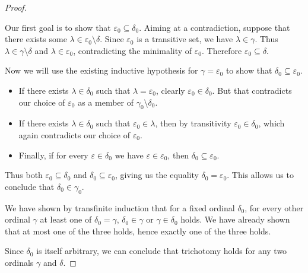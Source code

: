 \begin{proof}
\begin{itemize}
    Our first goal is to show that \( \varepsilon_0 \subseteq \delta_0 \). Aiming at a contradiction, suppose that there exists some \( \lambda \in \varepsilon_0 \setminus \delta \). Since \( \varepsilon_0 \) is a transitive set, we have \( \lambda \in \gamma \). Thus \( \lambda \in \gamma \setminus \delta \) and \( \lambda \in \varepsilon_0 \), contradicting the minimality of \( \varepsilon_0 \). Therefore \( \varepsilon_0 \subseteq \delta \).

    Now we will use the existing inductive hypothesis for \( \gamma = \varepsilon_0 \) to show that \( \delta_0 \subseteq \varepsilon_0 \).

    \begin{itemize}
      \item If there exists \( \lambda \in \delta_0 \) such that \( \lambda = \varepsilon_0 \), clearly \( \varepsilon_0 \in \delta_0 \). But that contradicts our choice of \( \varepsilon_0 \) as a member of \( \gamma_0 \setminus \delta_0 \).

      \item If there exists \( \lambda \in \delta_0 \) such that \( \varepsilon_0 \in \lambda \), then by transitivity \( \varepsilon_0 \in \delta_0 \), which again contradicts our choice of \( \varepsilon_0 \).

      \item Finally, if for every \( \varepsilon \in \delta_0 \) we have \( \varepsilon \in \varepsilon_0 \), then \( \delta_0 \subseteq \varepsilon_0 \).
    \end{itemize}

    Thus both \( \varepsilon_0 \subseteq \delta_0 \) and \( \delta_0 \subseteq \varepsilon_0 \), giving us the equality \( \delta_0 = \varepsilon_0 \). This allows us to conclude that \( \delta_0 \in \gamma_0 \).
  \end{itemize}

  We have shown by transfinite induction that for a fixed ordinal \( \delta_0 \), for every other ordinal \( \gamma \) at least one of \( \delta_0 = \gamma \), \( \delta_0 \in \gamma \) or \( \gamma \in \delta_0 \) holds. We have already shown that at most one of the three holds, hence exactly one of the three holds.

  Since \( \delta_0 \) is itself arbitrary, we can conclude that trichotomy holds for any two ordinals \( \gamma \) and \( \delta \).
\end{proof}

